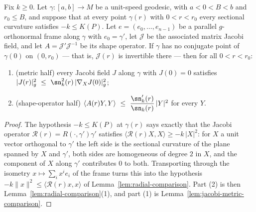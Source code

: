 \begin{lemma}
\label{lem:frame-sectional-comparison}
\leanok



Fix $k\ge0$. Let $\gamma\colon[a,b]\to M$ be a unit-speed geodesic, with
$a<0<B<b$ and $r_0\le B$, and suppose that at every point $\gamma(r)$ with
$0<r<r_0$ every sectional curvature satisfies $-k\le K(P)$. Let
$e=(e_0,\ldots,e_{n-1})$ be a parallel $g$-orthonormal frame along $\gamma$
with $e_0=\gamma'$, let $\mathcal J$ be the associated matrix Jacobi field,
and let $A=\mathcal J'\mathcal J^{-1}$ be its shape operator. If $\gamma$ has
no conjugate point of $\gamma(0)$ on $(0,r_0)$ --- that is, $\mathcal J(r)$ is
invertible there --- then for all $0<r<r_0$:
\begin{enumerate}
\item (metric half) every Jacobi field $J$ along $\gamma$ with $J(0)=0$
satisfies $|J(r)|_g^2\ \le\ \sn_k^2(r)\,|\nabla_XJ(0)|_g^2$;
\item (shape-operator half)
$\langle A(r)Y,Y\rangle\ \le\ \dfrac{\sn_k'(r)}{\sn_k(r)}\,|Y|^2$ for every $Y$.
\end{enumerate}
\end{lemma}

\begin{proof}
\sketch
{}
\leanok
The hypothesis $-k\le K(P)$ at $\gamma(r)$ says exactly that the Jacobi operator
$\mathcal R(r)=R(\cdot,\gamma')\gamma'$ satisfies
$\langle\mathcal R(r)X,X\rangle\ge-k\,|X|^2$: for $X$ a unit vector orthogonal to
$\gamma'$ the left side is the sectional curvature of the plane spanned by $X$ and
$\gamma'$, both sides are homogeneous of degree $2$ in $X$, and the component of
$X$ along $\gamma'$ contributes $0$ to both. Transporting through the isometry
$x\mapsto\sum_ix^ie_i$ of the frame turns this into the hypothesis
$-k\|x\|^2\le\langle\mathcal R(r)x,x\rangle$ of
Lemma~\ref{lem:radial-comparison}. Part (2) is then
Lemma~\ref{lem:radial-comparison}(1), and part (1) is
Lemma~\ref{lem:jacobi-metric-comparison}.
\end{proof}

